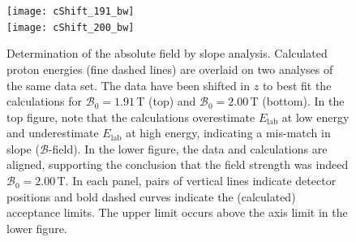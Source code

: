 \begin{figure}%
\centering
\texttt{[image: cShift\_191\_bw]}\\
\texttt{[image: cShift\_200\_bw]}%
\caption[Determination of the absolute field by slope analysis]{Determination of the absolute field by slope analysis.  Calculated proton energies (fine dashed lines) are overlaid on two analyses of the same data set.  The data have been shifted in $z$ to best fit the calculations for $\mathscr{B}_0=1.91$\,T (top) and $\mathscr{B}_0=2.00$\,T (bottom).  In the top figure, note that the calculations overestimate $E_\mathrm{lab}$ at low energy and underestimate $E_\mathrm{lab}$ at high energy, indicating a mis-match in slope ($\mathscr{B}$-field).  In the lower figure, the data and calculations are aligned, supporting the conclusion that the field strength was indeed $\mathscr{B}_0=2.00$\,T.  In each panel, pairs of vertical lines indicate detector positions and bold dashed curves indicate the (calculated) acceptance limits.  The upper limit occurs above the axis limit in the lower figure.}%
\label{badslope}%
\end{figure}